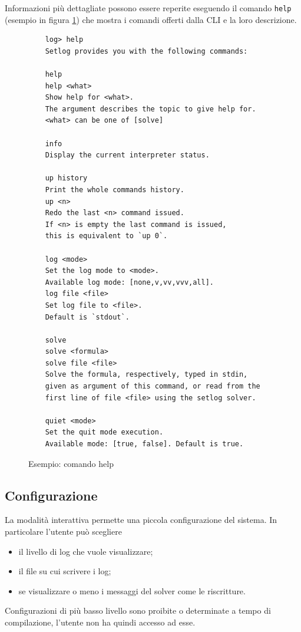 \documentclass[12pt,a4paper,openright]{book}  %
\begin{document}
Informazioni più dettagliate possono essere reperite eseguendo il
comando \texttt{help} (esempio in figura
\ref{fig:example_helpcommand}) che mostra i comandi offerti dalla CLI
e la loro descrizione.

\begin{figure}
	\begin{verbatim}
	log> help
	Setlog provides you with the following commands:

	help
	help <what>
	Show help for <what>.
	The argument describes the topic to give help for.
	<what> can be one of [solve]

	info
	Display the current interpreter status.

	up history
	Print the whole commands history.
	up <n>
	Redo the last <n> command issued.
	If <n> is empty the last command is issued,
	this is equivalent to `up 0`.

	log <mode>
	Set the log mode to <mode>.
	Available log mode: [none,v,vv,vvv,all].
	log file <file>
	Set log file to <file>.
	Default is `stdout`.

	solve
	solve <formula>
	solve file <file>
	Solve the formula, respectively, typed in stdin,
	given as argument of this command, or read from the
	first line of file <file> using the setlog solver.

	quiet <mode>
	Set the quit mode execution.
	Available mode: [true, false]. Default is true.
	\end{verbatim}

	\caption{Esempio: comando help}
	\label{fig:example_helpcommand}
\end{figure}

\subsection{Configurazione}

La modalità interattiva permette una piccola configurazione del
sistema. In particolare l'utente può scegliere
\begin{itemize}
	\item il livello di log che vuole visualizzare;
	\item il file su cui scrivere i log;
	\item se visualizzare o meno i messaggi del solver come le
          riscritture.
\end{itemize}

Configurazioni di più basso livello sono proibite o determinate a
tempo di compilazione, l'utente non ha quindi accesso ad esse.
\end{document}
